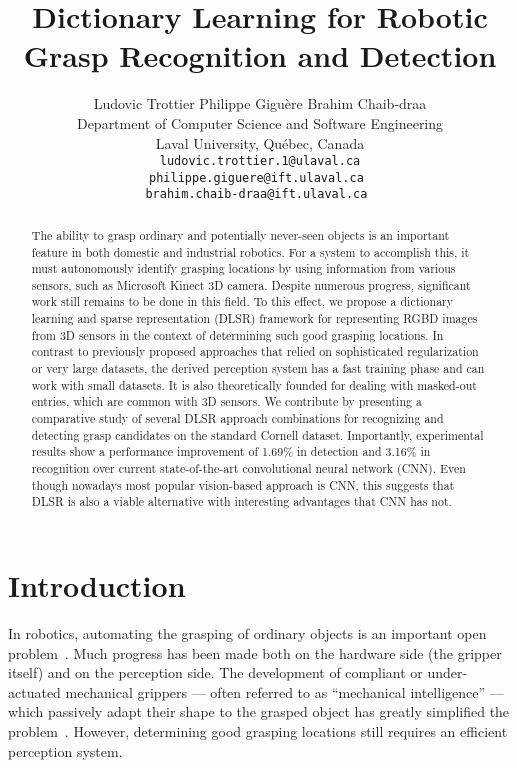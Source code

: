 \documentclass[svgnames]{scrartcl}
\title{Dictionary Learning for Robotic Grasp Recognition and Detection}
\author{
  Ludovic Trottier \qquad  Philippe Gigu\`ere  \qquad  Brahim Chaib-draa \\
  Department of Computer Science and Software Engineering \\
  Laval University, Qu\'ebec, Canada \\
  \texttt{ludovic.trottier.1@ulaval.ca} \\
  \texttt{philippe.giguere@ift.ulaval.ca } \\
  \texttt{brahim.chaib-draa@ift.ulaval.ca } \\
}
\date{}
\begin{document}


\maketitle

\begin{abstract}

The ability to grasp ordinary and potentially never-seen objects is an important feature in both domestic and industrial robotics. For a system to accomplish this, it must autonomously identify grasping locations by using information from various sensors, such as Microsoft Kinect 3D camera. Despite numerous progress, significant work still remains to be done in this field. To this effect, we propose a dictionary learning and sparse representation (DLSR) framework for representing RGBD images from 3D sensors in the context of determining such good grasping locations. In contrast to previously proposed approaches that relied on sophisticated regularization or very large datasets, the derived perception system has a fast training phase and can work with small datasets. It is also theoretically founded for dealing with masked-out entries, which are common with 3D sensors. We contribute by presenting a comparative study of several DLSR approach combinations for recognizing and detecting grasp candidates on the standard Cornell dataset. Importantly, experimental results show a performance improvement of 1.69\% in detection and 3.16\% in recognition over current state-of-the-art convolutional neural network (CNN). Even though nowadays most popular vision-based approach is CNN, this suggests that DLSR is also a viable alternative with interesting advantages that CNN has not.

\end{abstract}


\section{Introduction}
In robotics, automating the grasping of ordinary objects is an important open problem~\citep{redmonRealtimeCnnGrasp}. Much progress has been made both on the hardware side (the gripper itself) and on the perception side. The development of compliant or under-actuated mechanical grippers --- often referred to as ``mechanical intelligence'' --- which passively adapt their shape to the grasped object has greatly simplified the problem~\citep{laliberte2002underactuation}. However, determining good grasping locations still requires an efficient perception system. 
\end{document}
